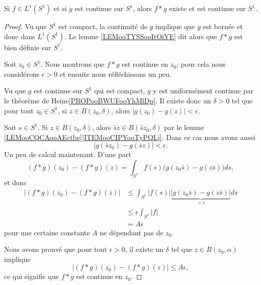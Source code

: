 \begin{lemma}
    Si \( f\in L^1(S^1)\) et si \( g\) est continue sur \( S^1\), alors \( f*g\) existe et est continue sur \( S^1\).
\end{lemma}

\begin{proof}
    Vu que \( S^1\) est compact, la continuité de \( g\) implique que \( g\) est bornée et donc dans \( L^1(S^1)\). Le lemme \ref{LEMooTYSSooItOiYE} dit alors que \( f*g\) est bien définie sur \( S^1\).

    Soit \( z_0\in S^1\). Nous montrons que \( f*g\) est continue en \( z_0\); pour cela nous considérons \( \epsilon>0\) et ensuite nous réfléchissons un peu. 
    
    Vu que \( g\) est continue sur \( S^1\) qui est compact, \( g\) y est uniformément continue par le théorème de Heine\ref{PROPooBWUFooYhMlDp}. Il existe donc un \( \delta>0\) tel que pour tout \( z_0\in S^1\), si \( z\in B(z_0,\delta)\), alors \( | g(z_0)-g(z) |<\epsilon\).

    Soit \( s\in S^1\). Si \( z\in B(z_0,\delta)\), alors \( \bar sz\in B(\bar sz_0,\delta)\) par le lemme \ref{LEMooCQCAooAEctbe}\ref{ITEMooCIPYooTyPQLj}. Dans ce cas nous avons aussi
    \begin{equation}
        | g(\bar s z_0)-g(\bar sz) |<\epsilon.
    \end{equation}
    Un peu de calcul maintenant. D'une part
    \begin{equation}
        (f*g)(z_0)-(f*g)(z)=\int_{S^1}f(s)\big( g(z_0\bar s)-g(z\bar s) \big)ds,
    \end{equation}
    et donc
    \begin{subequations}
        \begin{align}
            |(f*g)(z_0)-(f*g)(z)|&\leq\int_{S^1}|f(s)| \underbrace{\big|  g(z_0\bar s)-g(z\bar s) \big|}_{<\epsilon} ds\\
            &\leq \epsilon\int_{S^1}| f |\\
            &=A\epsilon
        \end{align}
    \end{subequations}
    pour une certaine constante \( A\) ne dépendant pas de \( z_0\).

    Nous avons prouvé que pour tout \( \epsilon>0\), il existe un \( \delta\) tel que \( z\in B(z_0,\alpha)\) implique 
    \begin{equation}
            |(f*g)(z_0)-(f*g)(z)|\leq A\epsilon,
    \end{equation}
    ce qui signifie que \( f*g\) est continue en \( z_0\).
\end{proof}

